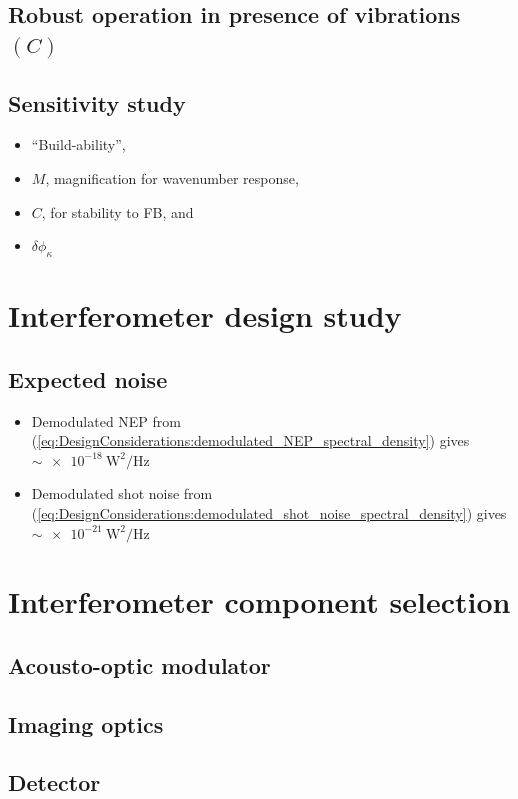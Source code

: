 \subsection{Robust operation in presence of vibrations $(C)$}


\subsection{Sensitivity study}
\begin{itemize}
  \item ``Build-ability'',
  \item $M$, magnification for wavenumber response,
  \item $C$, for stability to FB, and
  \item $\delta \phi_{\kappa}$
\end{itemize}


\section{Interferometer design study}


\subsection{Expected noise}

\begin{itemize}
  \item Demodulated NEP from
    (\ref{eq:DesignConsiderations:demodulated_NEP_spectral_density}) gives
    $\sim \SI{e-18}{\watt\squared\per\hertz}$
  \item Demodulated shot noise from
    (\ref{eq:DesignConsiderations:demodulated_shot_noise_spectral_density})
    gives $\sim \SI{e-21}{\watt\squared\per\hertz}$
\end{itemize}


\section{Interferometer component selection}
\subsection{Acousto-optic modulator}
\subsection{Imaging optics}
\subsection{Detector}

